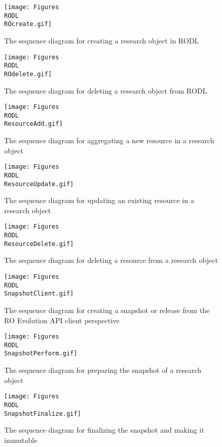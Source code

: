 \begin{figure}[!hb]
\centering
\texttt{[image: Figures\\RODL\\ROcreate.gif]}
\caption{The sequence diagram for creating a research object in RODL}
\label{ROCreate}
\end{figure}

\begin{figure}[!hb]
\centering
\texttt{[image: Figures\\RODL\\ROdelete.gif]}
\caption{The sequence diagram for deleting a research object from RODL}
\label{RODelete}
\end{figure}

\begin{figure}[!hb]
\centering
\texttt{[image: Figures\\RODL\\ResourceAdd.gif]}
\caption{The sequence diagram for aggregating a new resource in a research object}
\label{ResourceAdd}
\end{figure}

\begin{figure}[!hb]
\centering
\texttt{[image: Figures\\RODL\\ResourceUpdate.gif]}
\caption{The sequence diagram for updating an existing resource in a research object}
\label{ResourceUpdate}
\end{figure}

\begin{figure}[!hb]
\centering
\texttt{[image: Figures\\RODL\\ResourceDelete.gif]}
\caption{The sequence diagram for deleting a resource from a research object}
\label{ResourceDelete}
\end{figure}

\begin{figure}[!hb]
\centering
\texttt{[image: Figures\\RODL\\SnapshotClient.gif]}
\caption{The sequence diagram for creating a snapshot or release from the RO Evolution API client perspective}
\label{SnapshotClient}
\end{figure}

\begin{figure}[!hb]
\centering
\texttt{[image: Figures\\RODL\\SnapshotPerform.gif]}
\caption{The sequence diagram for preparing the snapshot of a research object}
\label{SnapshotPerform}
\end{figure}

\begin{figure}[!hb]
\centering
\texttt{[image: Figures\\RODL\\SnapshotFinalize.gif]}
\caption{The sequence diagram for finalizing the snapshot and making it immutable}
\label{SnapshotFinalize}
\end{figure}

